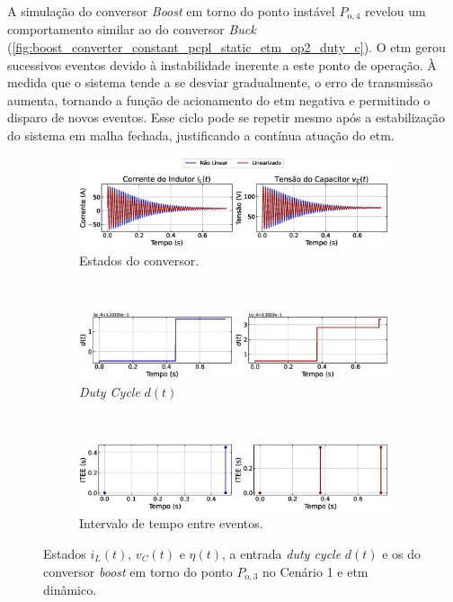 A simulação do conversor \textit{Boost }em torno do ponto instável $P_{\mathrm{o}, 4}$ revelou um comportamento similar ao do conversor \textit{Buck} (\autoref{fig:boost_converter_constant_pcpl_static_etm_op2_duty_c}). O \acrshort{etm} gerou sucessivos eventos devido à instabilidade inerente a este ponto de operação. À medida que o sistema tende a se desviar gradualmente, o erro de transmissão aumenta, tornando a função de acionamento do \acrshort{etm}  negativa e permitindo o disparo de novos eventos. Esse ciclo pode se repetir mesmo após a estabilização do sistema em malha fechada, justificando a contínua atuação do \acrshort{etm}.

\begin{figure}[H]
  \centering
  \captionsetup{justification=centering}
  \begin{subfigure}{1.\textwidth}
    \centering
    \includegraphics[width=1.\textwidth]{figuras/dynamic-etm/boost/sim1/op1/result.eps}
    \caption{Estados do conversor.}
    \label{fig:boost_converter_constant_pcpl_dynamic_etm_op1_a}
  \end{subfigure}
  \\[6pt]
  \begin{subfigure}{1.\textwidth}
    \centering
    \includegraphics[width=1.\textwidth]{figuras/dynamic-etm/boost/sim1/op1/duty-cycle.eps}
    \caption{\textit{Duty Cycle} $d(t)$}
    \label{fig:boost_converter_constant_pcpl_dynamic_etm_op1_b}
  \end{subfigure}
  \\[6pt]
  \begin{subfigure}{1.\textwidth}
    \centering
    \includegraphics[width=1.\textwidth]{figuras/dynamic-etm/boost/sim1/op1/inter-event-times.eps}
    \caption{Intervalo de tempo entre eventos.}
    \label{fig:boost_converter_constant_pcpl_dynamic_etm_op1_c}
  \end{subfigure}
  \caption{Estados $i_L(t)$, $v_C(t)$ e $\eta(t)$, a entrada \textit{duty cycle} $d(t)$ e os  do conversor \textit{boost }em torno do ponto $P_{\mathrm{o}, 3}$ no Cenário 1 e \acrshort{etm} dinâmico.}
  \label{fig:boost_converter_constant_pcpl_dynamic_etm_op1}
\end{figure}


